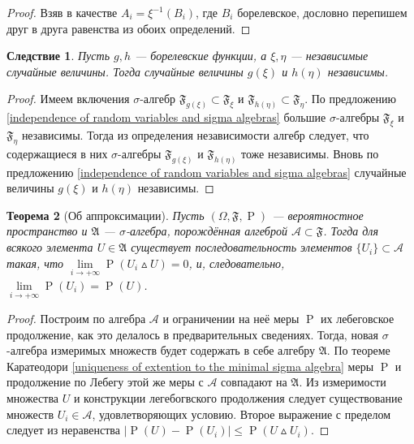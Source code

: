 \documentclass[12pt]{article}
\newtheorem{theorem}{Теорема}
\newtheorem{corollary}[theorem]{Следствие}
\numberwithin{theorem}{section}
\theoremstyle{definition}
\newcommand{\calA}{\mathcal{A}}
\newcommand{\setsigmaalg}{\mathfrak{A}}
\newcommand{\prob}{\operatorname{P}}
\newcommand{\events}{\mathfrak{F}}
\begin{document}
	\begin{proof}
		Взяв в качестве $ A_i = \xi^{-1}(B_i) $, где $ B_i $ борелевское, дословно перепишем друг в друга равенства из обоих определений.
	\end{proof}
	
	\begin{corollary}
		Пусть $ g, h $ --- борелевские функции, а $ \xi, \eta $ --- независимые случайные величины.
		Тогда случайные величины $ g(\xi) $ и $ h(\eta) $ независимы.
	\end{corollary}
	
	\begin{proof}
		Имеем включения $ \sigma $-алгебр $ \events_{g(\xi)} \subset \events_{\xi} $
		и $ \events_{h(\eta)} \subset \events_{\eta} $.
		По предложению \ref{independence of random variables and sigma algebras} большие
		$ \sigma $-алгебры $ \events_{\xi} $ и $ \events_{\eta} $ независимы.
		Тогда из определения независимости алгебр следует, что содержащиеся в них
		$ \sigma $-алгебры $ \events_{g(\xi)} $ и $ \events_{h(\eta)} $ тоже независимы.
		Вновь по предложению \ref{independence of random variables and sigma algebras}
		случайные величины $ g(\xi) $ и $ h(\eta) $ независимы.
	\end{proof}
	
	\begin{theorem}[Об аппроксимации] \label{approximation}
		Пусть $ (\Omega, \events, \prob) $ --- вероятностное пространство
		и $ \setsigmaalg $ --- $ \sigma $-алгебра, порождённая алгеброй $ \calA \subset \events $.
		Тогда для всякого элемента $ U \in \setsigmaalg $ существует последовательность
		элементов $ \{U_i\} \subset \calA $ такая, что $ \lim\limits_{i \to +\infty} \prob(U_i \vartriangle U) = 0 $,
		и, следовательно, $ \lim\limits_{i \to +\infty}{\prob(U_i)} = \prob(U) $.
	\end{theorem}
	
	\begin{proof}
		Построим по алгебра $ \calA $ и ограничении на неё меры $ \prob $ их лебеговское продолжение,
		как это делалось в предварительных сведениях.
		Тогда, новая $ \sigma $-алгебра измеримых множеств будет содержать в себе алгебру $ \setsigmaalg $.
		По теореме Каратеодори \ref{uniqueness of extention to the minimal sigma algebra} 
		меры $ \prob $ и продолжение по Лебегу этой же меры с $ \calA $ совпадают на $ \setsigmaalg $.
		Из измеримости множества $ U $ и конструкции легебогвского продолжения следует существование
		множеств $ U_i \in \calA $, удовлетворяющих условию.
		Второе выражение с пределом следует из неравенства $ |\prob(U) - \prob(U_i)| \leqslant \prob(U \vartriangle U_i) $.
	\end{proof}
	
\end{document}
